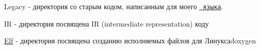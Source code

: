 Legacy -\/ директория со старым кодом, написанным для моего \href{https://github.com/ArsenySamoylov/Lang.git}{\texttt{ языка}}.

IR -\/ директория посвящена IR (intermediate representation) коду

\mbox{\hyperlink{struct_elf}{Elf}} -\/ директория посвящена созданию исполняемых файлов для Линуксаdoxygen 